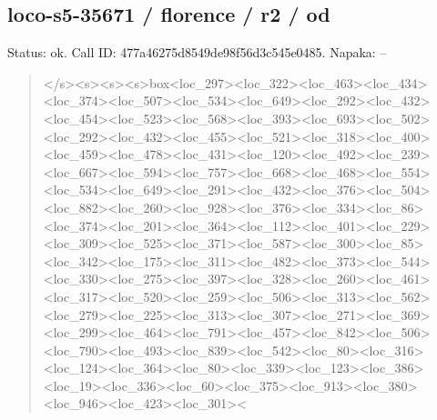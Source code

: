 \documentclass[10pt,a4paper]{article}
\begin{document}
\subsection*{loco-s5-35671 / florence / r2 / od}
Status: ok. Call ID: 477a46275d8549de98f56d3c545e0485. Napaka: --
\begin{quote}\footnotesize
</s>\allowbreak{}<s>\allowbreak{}<s>\allowbreak{}<s>\allowbreak{}box<loc\_297>\allowbreak{}<loc\_32\allowbreak{}2>\allowbreak{}<loc\_463>\allowbreak{}<loc\_434>\allowbreak{}<loc\_374>\allowbreak{}<lo\allowbreak{}c\_507>\allowbreak{}<loc\_534>\allowbreak{}<loc\_649>\allowbreak{}<loc\_292\allowbreak{}>\allowbreak{}<loc\_432>\allowbreak{}<loc\_454>\allowbreak{}<loc\_523>\allowbreak{}<loc\allowbreak{}\_568>\allowbreak{}<loc\_393>\allowbreak{}<loc\_693>\allowbreak{}<loc\_502>\allowbreak{}\allowbreak{}<loc\_292>\allowbreak{}<loc\_432>\allowbreak{}<loc\_455>\allowbreak{}<loc\_\allowbreak{}521>\allowbreak{}<loc\_318>\allowbreak{}<loc\_400>\allowbreak{}<loc\_459>\allowbreak{}<\allowbreak{}loc\_478>\allowbreak{}<loc\_431>\allowbreak{}<loc\_120>\allowbreak{}<loc\_4\allowbreak{}92>\allowbreak{}<loc\_239>\allowbreak{}<loc\_667>\allowbreak{}<loc\_594>\allowbreak{}<l\allowbreak{}oc\_757>\allowbreak{}<loc\_668>\allowbreak{}<loc\_468>\allowbreak{}<loc\_55\allowbreak{}4>\allowbreak{}<loc\_534>\allowbreak{}<loc\_649>\allowbreak{}<loc\_291>\allowbreak{}<lo\allowbreak{}c\_432>\allowbreak{}<loc\_376>\allowbreak{}<loc\_504>\allowbreak{}<loc\_882\allowbreak{}>\allowbreak{}<loc\_260>\allowbreak{}<loc\_928>\allowbreak{}<loc\_376>\allowbreak{}<loc\allowbreak{}\_334>\allowbreak{}<loc\_86>\allowbreak{}<loc\_374>\allowbreak{}<loc\_201>\allowbreak{}<\allowbreak{}loc\_364>\allowbreak{}<loc\_112>\allowbreak{}<loc\_401>\allowbreak{}<loc\_2\allowbreak{}29>\allowbreak{}<loc\_309>\allowbreak{}<loc\_525>\allowbreak{}<loc\_371>\allowbreak{}<l\allowbreak{}oc\_587>\allowbreak{}<loc\_300>\allowbreak{}<loc\_85>\allowbreak{}<loc\_342\allowbreak{}>\allowbreak{}<loc\_175>\allowbreak{}<loc\_311>\allowbreak{}<loc\_482>\allowbreak{}<loc\allowbreak{}\_373>\allowbreak{}<loc\_544>\allowbreak{}<loc\_330>\allowbreak{}<loc\_275>\allowbreak{}\allowbreak{}<loc\_397>\allowbreak{}<loc\_328>\allowbreak{}<loc\_260>\allowbreak{}<loc\_\allowbreak{}461>\allowbreak{}<loc\_317>\allowbreak{}<loc\_520>\allowbreak{}<loc\_259>\allowbreak{}<\allowbreak{}loc\_506>\allowbreak{}<loc\_313>\allowbreak{}<loc\_562>\allowbreak{}<loc\_2\allowbreak{}79>\allowbreak{}<loc\_225>\allowbreak{}<loc\_313>\allowbreak{}<loc\_307>\allowbreak{}<l\allowbreak{}oc\_271>\allowbreak{}<loc\_369>\allowbreak{}<loc\_299>\allowbreak{}<loc\_46\allowbreak{}4>\allowbreak{}<loc\_791>\allowbreak{}<loc\_457>\allowbreak{}<loc\_842>\allowbreak{}<lo\allowbreak{}c\_506>\allowbreak{}<loc\_790>\allowbreak{}<loc\_493>\allowbreak{}<loc\_839\allowbreak{}>\allowbreak{}<loc\_542>\allowbreak{}<loc\_80>\allowbreak{}<loc\_316>\allowbreak{}<loc\_\allowbreak{}124>\allowbreak{}<loc\_364>\allowbreak{}<loc\_80>\allowbreak{}<loc\_339>\allowbreak{}<l\allowbreak{}oc\_123>\allowbreak{}<loc\_386>\allowbreak{}<loc\_19>\allowbreak{}<loc\_336\allowbreak{}>\allowbreak{}<loc\_60>\allowbreak{}<loc\_375>\allowbreak{}<loc\_913>\allowbreak{}<loc\_\allowbreak{}380>\allowbreak{}<loc\_946>\allowbreak{}<loc\_423>\allowbreak{}<loc\_301>\allowbreak{}<\allow
\end{quote}
\end{document}
